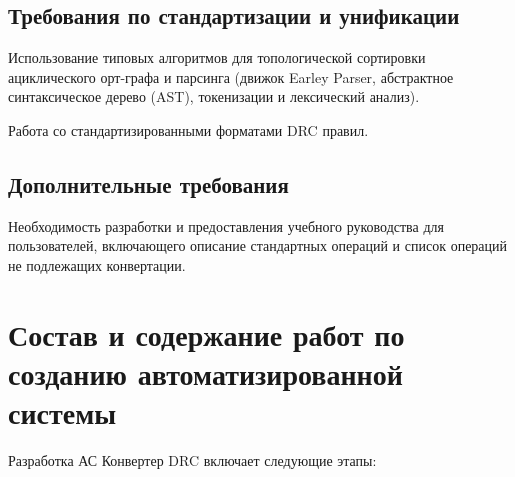 \subsection{Требования по стандартизации и унификации}

Использование типовых алгоритмов
для топологической сортировки ациклического орт-графа и парсинга
(движок Earley Parser, абстрактное синтаксическое дерево (AST),
токенизации и лексический анализ).

Работа со стандартизированными форматами DRC правил.

\subsection{Дополнительные требования}

Необходимость разработки и предоставления учебного руководства
для пользователей, включающего описание стандартных операций
и список операций не подлежащих конвертации.

\section{Состав и содержание работ по созданию автоматизированной системы}

Разработка АС Конвертер DRC включает следующие этапы:

